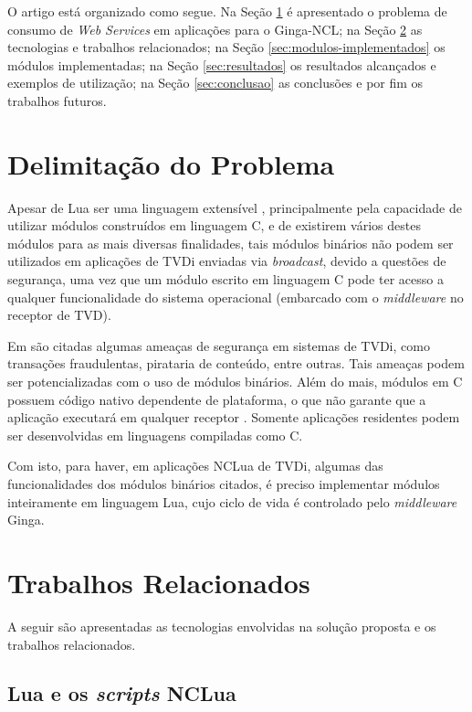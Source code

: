 O artigo está organizado como segue. Na Seção \ref{sec:problema} é apresentado o problema de consumo de \textit{Web Services} em aplicações
para o Ginga-NCL; na Seção \ref{sec:trabs-rel} as tecnologias e trabalhos relacionados;
na Seção \ref{sec:modulos-implementados} os módulos implementadas; 
na Seção \ref{sec:resultados} os resultados alcançados e exemplos de utilização;
na Seção \ref{sec:conclusao} as conclusões e por fim os trabalhos futuros.

\section{Delimitação do Problema} \label{sec:problema}

Apesar de Lua ser uma linguagem extensível \cite{ierusalimschy2007evolution}, principalmente pela capacidade de utilizar módulos construídos em linguagem C, e de existirem vários destes módulos para as mais diversas finalidades, tais módulos binários não podem ser utilizados em aplicações de TVDi enviadas via \textit{broadcast}, devido a questões de segurança, uma vez que um módulo escrito em linguagem C pode ter acesso a qualquer funcionalidade do sistema operacional (embarcado com o \textit{middleware} no receptor de TVD). 

Em \cite{braga-introducao} são citadas algumas ameaças de segurança em sistemas de TVDi, como 
transações fraudulentas, pirataria de conteúdo, entre outras. Tais ameaças podem ser potencializadas com o uso de módulos binários. Além do mais, módulos em C possuem código nativo dependente de plataforma, o que não garante que a aplicação executará em qualquer receptor \cite{costa-seguranca}.
Somente aplicações residentes podem ser desenvolvidas em linguagens compiladas como C.

Com isto, para haver, em aplicações NCLua de TVDi, algumas das funcionalidades dos módulos binários citados, é preciso
implementar módulos inteiramente em linguagem Lua, cujo ciclo de vida é controlado pelo \textit{middleware} Ginga\cite{abnt200815606}.

\section{Trabalhos Relacionados} \label{sec:trabs-rel}

A seguir são apresentadas as tecnologias envolvidas na solução
proposta e os trabalhos relacionados.

\subsection{Lua e os \textit{scripts} NCLua} \label{sec:lua-nclua}

